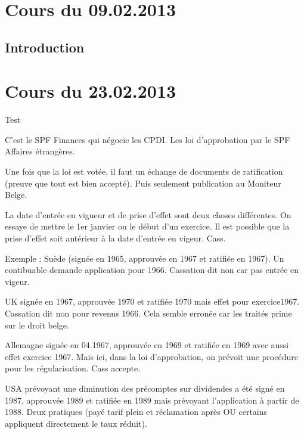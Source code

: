 \documentclass{book}
\begin{document}
\thispagestyle{empty}
\setcounter{page}{0}
\null
\newpage
{} \setcounter{page}{1} 




\tableofcontents



\chapter{Cours du 09.02.2013}
 \setcounter{page}{1} 

\section{Introduction}

\chapter{Cours du 23.02.2013}

Test

C’est le SPF Finances qui négocie les CPDI. Les loi d’approbation par le SPF Affaires étrangères.

Une fois que la loi est votée, il faut un échange de documents de ratification (preuve que tout est bien accepté). Puis seulement publication au Moniteur Belge.

La date d’entrée en vigueur et de prise d’effet sont deux choses différentes. On essaye de mettre le 1er janvier ou le début d’un exercice. Il est possible que la prise d’effet soit antérieur à la date d’entrée en vigeur. Cass.

Exemple : Suède (signée en 1965, approuvée en 1967 et ratifiée en 1967). Un contibuable demande application pour 1966. Cassation dit non car pas entrée en vigeur.

UK signée en 1967, approuvée 1970 et ratifiée 1970 mais effet pour exercice1967. Cassation dit non pour revenus 1966. Cela semble erronée car les traités prime sur le droit belge.

Allemagne signée en 04.1967, approuvée en 1969 et ratifiée en 1969 avec aussi effet exercice 1967. Mais ici, dans la loi d’approbation, on prévoit une procédure pour les régularisation. Cass accepte.

USA prévoyant une diminution des précomptes sur dividendes a été signé en 1987, approuvée 1989 et ratifiée en 1989 mais prévoyant l’application à partir de 1988. Deux pratiques (payé tarif plein et réclamation après OU certains appliquent directement le taux réduit).
\end{document}
